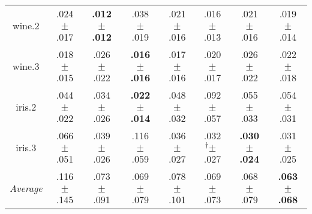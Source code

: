 \begin{tabular}{|c|ccccccc|}
wine.2 & .024$^{\phantom{\dag}}\pm^{\phantom{\dag}}$.017\cellcolor{green!4} & \textbf{.012$^{\phantom{\dag}}\pm^{\phantom{\dag}}$.012}\cellcolor{green!40} & .038$^{\phantom{\dag}}\pm^{\phantom{\dag}}$.019\cellcolor{red!40} & .021$^{\phantom{\dag}}\pm^{\phantom{\dag}}$.016\cellcolor{green!11} & .016$^{\phantom{\dag}}\pm^{\phantom{\dag}}$.013\cellcolor{green!28} & .021$^{\phantom{\dag}}\pm^{\phantom{\dag}}$.016\cellcolor{green!11} & .019$^{\phantom{\dag}}\pm^{\phantom{\dag}}$.014\cellcolor{green!18} \\
wine.3 & .018$^{\phantom{\dag}}\pm^{\phantom{\dag}}$.015\cellcolor{green!22} & .026$^{\phantom{\dag}}\pm^{\phantom{\dag}}$.022\cellcolor{red!40} & \textbf{.016$^{\phantom{\dag}}\pm^{\phantom{\dag}}$.016}\cellcolor{green!40} & .017$^{\phantom{\dag}}\pm^{\phantom{\dag}}$.016\cellcolor{green!32} & .020$^{\phantom{\dag}}\pm^{\phantom{\dag}}$.017\cellcolor{green!11} & .026$^{\phantom{\dag}}\pm^{\phantom{\dag}}$.022\cellcolor{red!40} & .022$^{\phantom{\dag}}\pm^{\phantom{\dag}}$.018\cellcolor{red!5} \\
iris.2 & .044$^{\phantom{\dag}}\pm^{\phantom{\dag}}$.022\cellcolor{green!14} & .034$^{\phantom{\dag}}\pm^{\phantom{\dag}}$.026\cellcolor{green!26} & \textbf{.022$^{\phantom{\dag}}\pm^{\phantom{\dag}}$.014}\cellcolor{green!40} & .048$^{\phantom{\dag}}\pm^{\phantom{\dag}}$.032\cellcolor{green!9} & .092$^{\phantom{\dag}}\pm^{\phantom{\dag}}$.057\cellcolor{red!40} & .055$^{\phantom{\dag}}\pm^{\phantom{\dag}}$.033\cellcolor{green!1} & .054$^{\phantom{\dag}}\pm^{\phantom{\dag}}$.031\cellcolor{green!3} \\
iris.3 & .066$^{\phantom{\dag}}\pm^{\phantom{\dag}}$.051\cellcolor{green!6} & .039$^{\phantom{\dag}}\pm^{\phantom{\dag}}$.026\cellcolor{green!32} & .116$^{\phantom{\dag}}\pm^{\phantom{\dag}}$.059\cellcolor{red!40} & .036$^{\phantom{\dag}}\pm^{\phantom{\dag}}$.027\cellcolor{green!35} & .032$^{\dag}\pm^{\phantom{\dag}}$.027\cellcolor{green!38} & \textbf{.030$^{\phantom{\dag}}\pm^{\phantom{\dag}}$.024}\cellcolor{green!40} & .031$^{\phantom{\dag}}\pm^{\phantom{\dag}}$.025\cellcolor{green!39} \\\hline
\textit{Average} & .116$^{\phantom{\dag}}\pm^{\phantom{\dag}}$.145\cellcolor{red!40} & .073$^{\phantom{\dag}}\pm^{\phantom{\dag}}$.091\cellcolor{green!25} & .069$^{\phantom{\dag}}\pm^{\phantom{\dag}}$.079\cellcolor{green!31} & .078$^{\phantom{\dag}}\pm^{\phantom{\dag}}$.101\cellcolor{green!17} & .069$^{\phantom{\dag}}\pm^{\phantom{\dag}}$.073\cellcolor{green!31} & .068$^{\phantom{\dag}}\pm^{\phantom{\dag}}$.079\cellcolor{green!32} & \textbf{.063$^{\phantom{\dag}}\pm^{\phantom{\dag}}$.068}\cellcolor{green!40} \\\hline
\end{tabular}